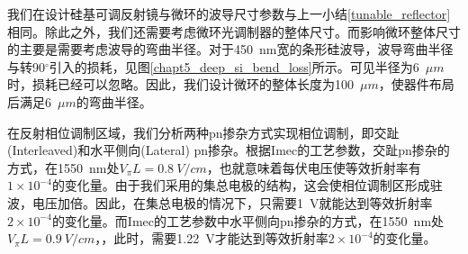 我们在设计硅基可调反射镜与微环的波导尺寸参数与上一小结\ref{tunable_reflector}相同。除此之外，我们还需要考虑微环光调制器的整体尺寸。而影响微环整体尺寸的主要是需要考虑波导的弯曲半径。对于450~nm宽的条形硅波导，波导弯曲半径与转90$^\circ$引入的损耗，见图\ref{chapt5_deep_si_bend_loss}所示。可见半径为6~$\mu m$时，损耗已经可以忽略。因此，我们设计微环的整体长度为100~$\mu m$，使器件布局后满足6~$\mu m$的弯曲半径。

在反射相位调制区域，我们分析两种pn掺杂方式实现相位调制，即交趾(Interleaved)和水平侧向(Lateral) pn掺杂。根据Imec的工艺参数\cite{Imec}，交趾pn掺杂的方式\cite{li2009silicon,pantouvaki2013comparison}，在1550~nm处$V_\pi L = 0.8~V/cm$，也就意味着每伏电压使等效折射率有$1 \times  10^{-4}$的变化量。由于我们采用的集总电极的结构，这会使相位调制区形成驻波，电压加倍。因此，在集总电极的情况下，只需要1~V就能达到等效折射率$2 \times  10^{-4}$的变化量。而Imec的工艺参数中水平侧向pn掺杂的方式\cite{pantouvaki2013comparison}，在1550~nm处$V_\pi L = 0.9~V/cm$，，此时，需要1.22~V才能达到等效折射率$2 \times 10^{-4}$的变化量。

